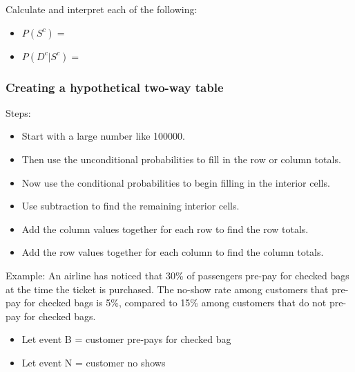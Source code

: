 \documentclass[
]{report}
\providecommand{\tightlist}{%
  \setlength{\itemsep}{0pt}\setlength{\parskip}{0pt}}
\begin{document}
\vspace{0.5in}

Calculate and interpret each of the following:


\begin{itemize}
\tightlist
\item
  \(P(S^c)=\)
\end{itemize}

\vspace{0.6in}

\begin{itemize}
\tightlist
\item
  \(P(D^c|S^c)=\)
\end{itemize}

\vspace{0.6in}


\hypertarget{creating-a-hypothetical-two-way-table}{%
\subsubsection*{Creating a hypothetical two-way table}\label{creating-a-hypothetical-two-way-table}}

Steps:

\begin{itemize}
\item
  Start with a large number like 100000.
\item
  Then use the unconditional probabilities to fill in the row or column totals.
\item
  Now use the conditional probabilities to begin filling in the interior cells.
\item
  Use subtraction to find the remaining interior cells.
\item
  Add the column values together for each row to find the row totals.
\item
  Add the row values together for each column to find the column totals.
\end{itemize}

\newpage

Example: An airline has noticed that 30\% of passengers pre-pay for checked bags at the time the ticket is purchased. The no-show rate among customers that pre-pay for checked bags is 5\%, compared to 15\% among customers that do not pre-pay for checked bags.

\begin{itemize}
\tightlist
\item
  Let event B = customer pre-pays for checked bag
\item
  Let event N = customer no shows
\end{itemize}
\end{document}
